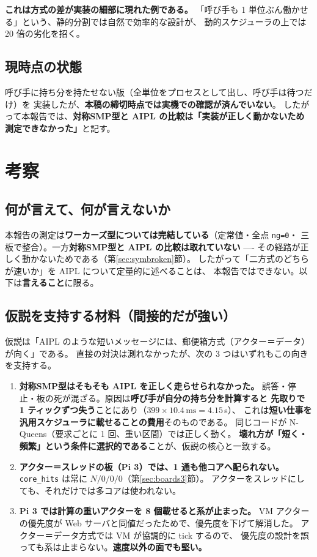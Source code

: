 \documentclass[a4paper,11pt]{ltjsarticle}
\begin{document}
\textbf{これは方式の差が実装の細部に現れた例である。}
「呼び手も 1 単位ぶん働かせる」という、静的分割では自然で効率的な設計が、
動的スケジューラの上では 20 倍の劣化を招く。

\subsection{現時点の状態}
呼び手に持ち分を持たせない版（全単位をプロセスとして出し、呼び手は待つだけ）を
実装したが、\textbf{本稿の締切時点では実機での確認が済んでいない}。
したがって本報告では、\textbf{対称SMP型と AIPL の比較は「実装が正しく動かないため
測定できなかった」}と記す。

\section{考察}

\subsection{何が言えて、何が言えないか}
本報告の測定は\textbf{ワーカーズ型については完結している}（定常値・全点 \texttt{ng=0}・
三板で整合）。一方\textbf{対称SMP型と AIPL の比較は取れていない} ----
その経路が正しく動かないためである（第\ref{sec:symbroken}節）。
したがって「二方式のどちらが速いか」を AIPL について定量的に述べることは、
本報告ではできない。以下は\textbf{言えること}に限る。

\subsection{仮説を支持する材料（間接的だが強い）}
仮説は「AIPL のような短いメッセージには、郵便箱方式（アクター＝データ）が向く」である。
直接の対決は測れなかったが、次の 3 つはいずれもこの向きを支持する。

\begin{enumerate}
\item \textbf{対称SMP型はそもそも AIPL を正しく走らせられなかった。}
      誤答・停止・板の死が混ざる。原因は\textbf{呼び手が自分の持ち分を計算すると
      先取りで 1 ティックずつ失う}ことにあり（$399 \times 10.4\,\mathrm{ms} = 4.15\,$s）、
      これは\textbf{短い仕事を汎用スケジューラに載せることの費用}そのものである。
      同じコードが N-Queens（要求ごとに 1 回、重い区間）では正しく動く。
      \textbf{壊れ方が「短く・頻繁」という条件に選択的である}ことが、仮説の核心と一致する。
\item \textbf{アクター＝スレッドの板（Pi 3）では、1 通も他コアへ配られない。}
      \texttt{core\_hits} は常に $N/0/0/0$（第\ref{sec:boards3}節）。
      アクターをスレッドにしても、それだけでは多コアは使われない。
\item \textbf{Pi 3 では計算の重いアクターを 8 個載せると系が止まった。}
      VM アクターの優先度が Web サーバと同値だったためで、優先度を下げて解消した。
      アクター＝データ方式では VM が協調的に tick するので、
      優先度の設計を誤っても系は止まらない。\textbf{速度以外の面でも堅い。}
\end{enumerate}
\end{document}
